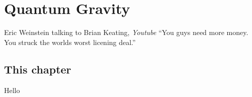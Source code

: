 \documentclass[../rzero]{subfiles}
\begin{document}
\chapter{Quantum Gravity}\label{quantumGravityChapter}

\begin{chapquote}{Eric Weinstein talking to Brian Keating, \textit{Youtube\cite{drbriankeatingEricWeinsteinTheoretical2020}}}
``You guys need more money. You struck the worlds worst licening deal.''
\end{chapquote}


\section{This chapter}
Hello
\end{document}
